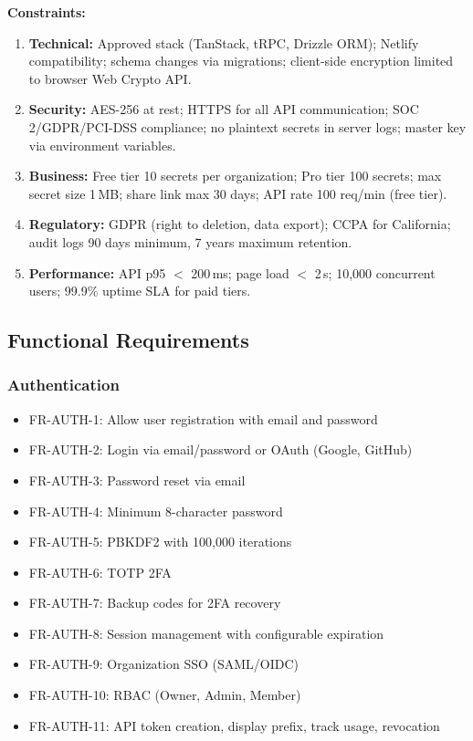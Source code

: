 \documentclass[12pt,a4paper]{article}
\begin{document}
\textbf{Constraints:}
\begin{enumerate}[leftmargin=*, itemsep=0.2em]
  \item \textbf{Technical:} Approved stack (TanStack, tRPC, Drizzle ORM); Netlify compatibility; schema changes via migrations; client-side encryption limited to browser Web Crypto API.
  \item \textbf{Security:} AES-256 at rest; HTTPS for all API communication; SOC 2/GDPR/PCI-DSS compliance; no plaintext secrets in server logs; master key via environment variables.
  \item \textbf{Business:} Free tier 10 secrets per organization; Pro tier 100 secrets; max secret size 1\,MB; share link max 30 days; API rate 100 req/min (free tier).
  \item \textbf{Regulatory:} GDPR (right to deletion, data export); CCPA for California; audit logs 90 days minimum, 7 years maximum retention.
  \item \textbf{Performance:} API p95 $<$ 200\,ms; page load $<$ 2\,s; 10,000 concurrent users; 99.9\% uptime SLA for paid tiers.
\end{enumerate}

\subsection{Functional Requirements}

\subsubsection{Authentication}
\begin{itemize}[leftmargin=*, itemsep=0.1em]
  \item FR-AUTH-1: Allow user registration with email and password
  \item FR-AUTH-2: Login via email/password or OAuth (Google, GitHub)
  \item FR-AUTH-3: Password reset via email
  \item FR-AUTH-4: Minimum 8-character password
  \item FR-AUTH-5: PBKDF2 with 100,000 iterations
  \item FR-AUTH-6: TOTP 2FA
  \item FR-AUTH-7: Backup codes for 2FA recovery
  \item FR-AUTH-8: Session management with configurable expiration
  \item FR-AUTH-9: Organization SSO (SAML/OIDC)
  \item FR-AUTH-10: RBAC (Owner, Admin, Member)
  \item FR-AUTH-11: API token creation, display prefix, track usage, revocation
\end{itemize}
\end{document}
